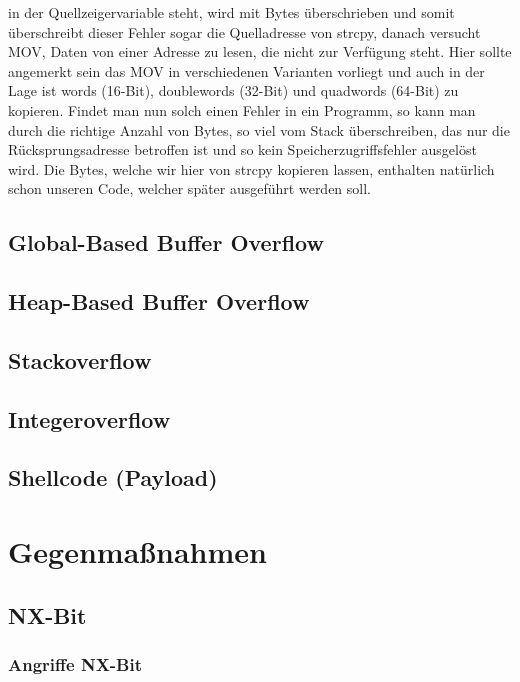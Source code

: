 ﻿\documentclass[12pt]{book}
\begin{document}
in der Quellzeigervariable steht, wird mit Bytes überschrieben und somit
überschreibt dieser Fehler sogar die Quelladresse von strcpy, danach versucht
MOV, Daten von einer Adresse zu lesen, die nicht zur Verfügung steht. Hier sollte
angemerkt sein das MOV in verschiedenen Varianten vorliegt und auch in der Lage
ist words (16-Bit), doublewords (32-Bit) und quadwords (64-Bit) zu kopieren.
Findet man nun solch einen Fehler in ein Programm, so kann man durch die
richtige Anzahl von Bytes, so viel vom Stack überschreiben, das nur die
Rücksprungsadresse betroffen ist und so kein Speicherzugriffsfehler ausgelöst
wird. Die Bytes, welche wir hier von strcpy kopieren lassen, enthalten natürlich
schon unseren Code, welcher später ausgeführt werden soll.

\subsection{Global-Based Buffer Overflow}

\subsection{Heap-Based Buffer Overflow}

\subsection{Stackoverflow}

\subsection{Integeroverflow}

\subsection{Shellcode (Payload)}

\section{Gegenmaßnahmen}

\subsection{NX-Bit}

\subsubsection{Angriffe NX-Bit}
\end{document}
